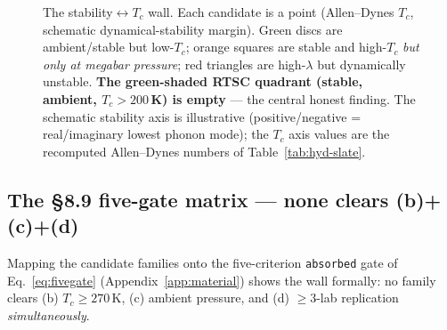 \begin{figure}[h]
\caption{The stability$\leftrightarrow$$T_c$ wall. Each candidate is a
point (Allen--Dynes $T_c$, schematic dynamical-stability margin). Green
discs are ambient/stable but low-$T_c$; orange squares are stable and
high-$T_c$ \emph{but only at megabar pressure}; red triangles are
high-$\lambda$ but dynamically unstable. \textbf{The green-shaded RTSC
quadrant (stable, ambient, $T_c\!>\!200$\,K) is empty} --- the central
honest finding. The schematic stability axis is illustrative
(positive/negative = real/imaginary lowest phonon mode); the $T_c$ axis
values are the recomputed Allen--Dynes numbers of
Table~\ref{tab:hyd-slate}.}
\label{fig:stab-tc}
\end{figure}

\subsection{The §8.9 five-gate matrix --- none clears (b)+(c)+(d)}
\label{app:hyd-fivegate}

Mapping the candidate families onto the five-criterion \texttt{absorbed}
gate of Eq.~\eqref{eq:fivegate} (Appendix~\ref{app:material}) shows the
wall formally: no family clears (b) $T_c\!\ge\!270$\,K, (c) ambient
pressure, and (d) $\ge\!3$-lab replication \emph{simultaneously}.

